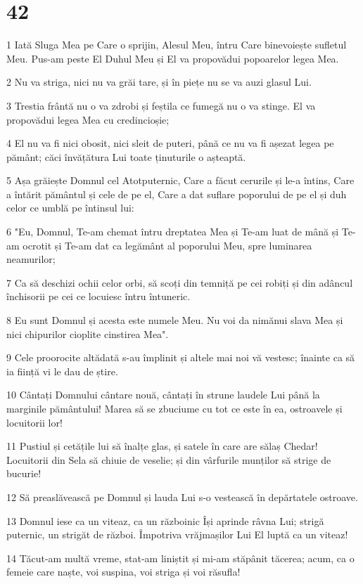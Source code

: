 \chapter{42}

\par 1 Iată Sluga Mea pe Care o sprijin, Alesul Meu, întru Care binevoiește sufletul Meu. Pus-am peste El Duhul Meu și El va propovădui popoarelor legea Mea.
\par 2 Nu va striga, nici nu va grăi tare, și în piețe nu se va auzi glasul Lui.
\par 3 Trestia frântă nu o va zdrobi și feștila ce fumegă nu o va stinge. El va propovădui legea Mea cu credincioșie;
\par 4 El nu va fi nici obosit, nici sleit de puteri, până ce nu va fi așezat legea pe pământ; căci învățătura Lui toate ținuturile o așteaptă.
\par 5 Așa grăiește Domnul cel Atotputernic, Care a făcut cerurile și le-a întins, Care a întărit pământul și cele de pe el, Care a dat suflare poporului de pe el și duh celor ce umblă pe întinsul lui:
\par 6 "Eu, Domnul, Te-am chemat întru dreptatea Mea și Te-am luat de mână și Te-am ocrotit și Te-am dat ca legământ al poporului Meu, spre luminarea neamurilor;
\par 7 Ca să deschizi ochii celor orbi, să scoți din temniță pe cei robiți și din adâncul închisorii pe cei ce locuiesc întru întuneric.
\par 8 Eu sunt Domnul și acesta este numele Meu. Nu voi da nimănui slava Mea și nici chipurilor cioplite cinstirea Mea".
\par 9 Cele proorocite altădată s-au împlinit și altele mai noi vă vestesc; înainte ca să ia ființă vi le dau de știre.
\par 10 Cântați Domnului cântare nouă, cântați în strune laudele Lui până la marginile pământului! Marea să se zbuciume cu tot ce este în ea, ostroavele și locuitorii lor!
\par 11 Pustiul și cetățile lui să înalțe glas, și satele în care are sălaș Chedar! Locuitorii din Sela să chiuie de veselie; și din vârfurile munților să strige de bucurie!
\par 12 Să preaslăvească pe Domnul și lauda Lui s-o vestească în depărtatele ostroave.
\par 13 Domnul iese ca un viteaz, ca un războinic Își aprinde râvna Lui; strigă puternic, un strigăt de război. Împotriva vrăjmașilor Lui El luptă ca un viteaz!
\par 14 Tăcut-am multă vreme, stat-am liniștit și mi-am stăpânit tăcerea; acum, ca o femeie care naște, voi suspina, voi striga și voi răsufla!
